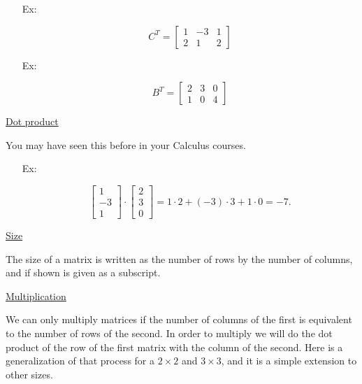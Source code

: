 \documentclass[reqno]{amsart}
\theoremstyle{definition}
\begin{document}
\begin{itemize}

\item[Ex:  ]

\begin{equation*}
C^T = \begin{bmatrix}
1 & -3 & 1\\
2 & 1 & 2
\end{bmatrix}
\end{equation*}

\item[Ex:  ]

\begin{equation*}
B^T = \begin{bmatrix}
2 & 3 & 0\\
1 & 0 & 4
\end{bmatrix}
\end{equation*}

\end{itemize}

\bigskip

\underline{Dot product}

You may have seen this before in your Calculus courses.

\begin{itemize}

\item[Ex:  ]

\begin{equation*}
\begin{bmatrix}
1\\
-3\\
1
\end{bmatrix}\cdot \begin{bmatrix}
2\\
3\\
0
\end{bmatrix} = 1\cdot 2 + (-3)\cdot 3 + 1\cdot 0 = -7.
\end{equation*}

\end{itemize}

\bigskip

\underline{Size}

The size of a matrix is written as the number of rows by the number of columns, and if shown is given as
a subscript.

\bigskip

\underline{Multiplication}

We can only multiply matrices if the number of columns of the first is equivalent to the number of rows of the second.  In order to multiply we will do the dot product of the row of the first matrix with the column of the second.  Here is a generalization of that process for a $2 \times 2$ and $3 \times 3$, and it is a simple extension to other sizes.
\end{document}
